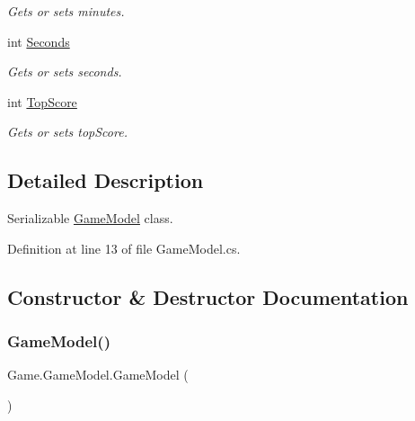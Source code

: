 \begin{DoxyCompactItemize}
\begin{DoxyCompactList}\small\item\em Gets or sets minutes. \end{DoxyCompactList}\item 
int \mbox{\hyperlink{class_game_1_1_game_model_a0ffff51770fa711cb6d14896baef1143}{Seconds}}
\begin{DoxyCompactList}\small\item\em Gets or sets seconds. \end{DoxyCompactList}\item 
int \mbox{\hyperlink{class_game_1_1_game_model_af83a3c0ce62920e6b388dcef3ad6bfae}{Top\+Score}}
\begin{DoxyCompactList}\small\item\em Gets or sets top\+Score. \end{DoxyCompactList}\end{DoxyCompactItemize}


\subsection{Detailed Description}
Serializable \mbox{\hyperlink{class_game_1_1_game_model}{Game\+Model}} class. 



Definition at line 13 of file Game\+Model.\+cs.



\subsection{Constructor \& Destructor Documentation}
\mbox{\label{class_game_1_1_game_model_a4fcc812732987f1d24505da1e90de974}} 
\subsubsection{\texorpdfstring{GameModel()}{GameModel()}}
{\footnotesize\ttfamily Game.\+Game\+Model.\+Game\+Model (\begin{DoxyParamCaption}{ }\end{DoxyParamCaption})}



